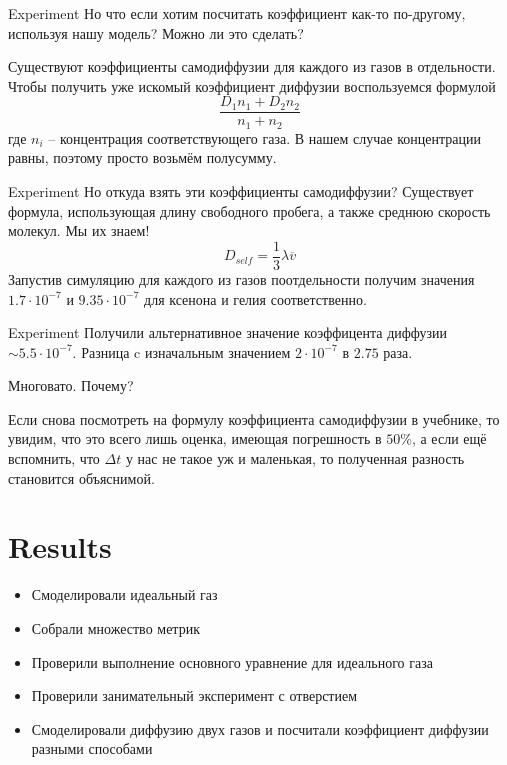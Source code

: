 \documentclass{beamer}
\begin{document}
\begin{frame}{Experiment}
  Но что если хотим посчитать коэффициент как-то по-другому, используя нашу модель? Можно ли это сделать? 
  
  \pause[2]
  Существуют коэффициенты самодиффузии для каждого из газов в отдельности. Чтобы получить уже искомый коэффициент диффузии воспользуемся формулой
  \[
    \frac{D_1n_1 + D_2n_2}{n_1 + n_2}
  \]
  где $n_i$ -- концентрация соответствующего газа. В нашем случае концентрации равны, поэтому просто возьмём полусумму.
\end{frame}

\begin{frame}{Experiment}
  Но откуда взять эти коэффициенты самодиффузии? Существует формула, использующая длину свободного пробега, а также среднюю скорость молекул. Мы их знаем!
  \[
    D_{self} = \frac{1}{3}\lambda\overline{v}
  \]
  Запустив симуляцию для каждого из газов поотдельности получим значения $1.7 \cdot 10^{-7}$ и $9.35 \cdot 10^{-7}$ для ксенона и гелия соответственно.
\end{frame}

\begin{frame}{Experiment}
  Получили альтернативное значение коэффицента диффузии $\sim 5.5 \cdot 10^{-7}$. Разница c изначальным значением $2 \cdot 10^{-7}$ в $2.75$ раза. 
  
  Многовато. Почему?

  Если снова посмотреть на формулу коэффициента самодиффузии в учебнике, то увидим, что это всего лишь оценка, имеющая погрешность в $50 \%$, а если ещё вспомнить, что $\Delta t$ у нас не такое уж и маленькая, то полученная разность становится объяснимой.
\end{frame}

\section{Results}

\begin{frame}
  \begin{itemize}
    \item<1-> Смоделировали идеальный газ
    \item<2-> Собрали множество метрик
    \item<3-> Проверили выполнение основного уравнение для идеального газа
    \item<4-> Проверили занимательный эксперимент с отверстием
    \item<5-> Смоделировали диффузию двух газов и посчитали коэффициент диффузии разными способами
  \end{itemize}
\end{frame}
\end{document}
